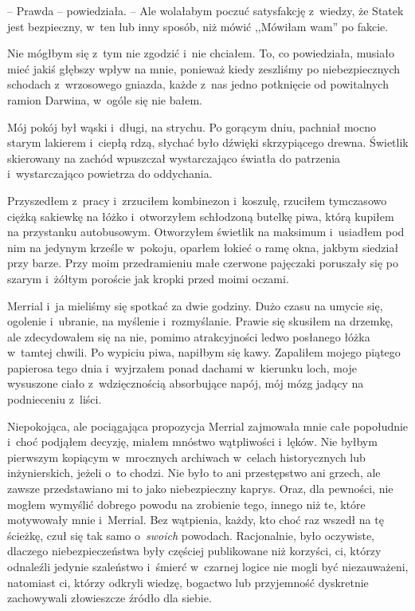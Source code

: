 \documentclass[oneside,polish,11pt,sfheadings]{mwbk}
\begin{document}
-- Prawda -- powiedziała. -- Ale wolałabym poczuć satysfakcję z~wiedzy, że
Statek jest bezpieczny, w~ten lub inny sposób, niż mówić ,,Mówiłam wam''
po fakcie.

Nie mógłbym się z~tym nie zgodzić i~nie chciałem. To, co powiedziała,
musiało mieć jakiś głębszy wpływ na mnie, ponieważ kiedy zeszliśmy po
niebezpiecznych schodach z~wrzosowego gniazda, każde z~nas jedno
potknięcie od powitalnych ramion Darwina, w~ogóle się nie bałem.

Mój pokój był wąski i~długi, na strychu. Po gorącym dniu, pachniał mocno
starym lakierem i~ciepłą rdzą, słychać było dźwięki skrzypiącego drewna.
Świetlik skierowany na zachód wpuszczał wystarczająco światła do
patrzenia i~wystarczająco powietrza do oddychania.

Przyszedłem z~pracy i~zrzuciłem kombinezon i~koszulę, rzuciłem
tymczasowo ciężką sakiewkę na łóżko i~otworzyłem schłodzoną butelkę
piwa, którą kupiłem na przystanku autobusowym. Otworzyłem świetlik na
maksimum i~usiadłem pod nim na jedynym krześle w~pokoju, oparłem łokieć
o ramę okna, jakbym siedział przy barze. Przy moim przedramieniu małe
czerwone pajęczaki poruszały się po szarym i~żółtym poroście jak kropki
przed moimi oczami.

Merrial i~ja mieliśmy się spotkać za dwie godziny. Dużo czasu na umycie
się, ogolenie i~ubranie, na myślenie i~rozmyślanie. Prawie się skusiłem
na drzemkę, ale zdecydowałem się na nie, pomimo atrakcyjności ledwo
posłanego łóżka w~tamtej chwili. Po wypiciu piwa, napiłbym się kawy.
Zapaliłem mojego piątego papierosa tego dnia i~wyjrzałem ponad dachami w~kierunku loch, moje wysuszone ciało z~wdzięcznością absorbujące napój,
mój mózg jadący na podnieceniu z~liści.

Niepokojąca, ale pociągająca propozycja Merrial zajmowała mnie całe
popołudnie i~choć podjąłem decyzję, miałem mnóstwo wątpliwości i~lęków.
Nie byłbym pierwszym kopiącym w~mrocznych archiwach w~celach
historycznych lub inżynierskich, jeżeli o~to chodzi. Nie było to ani
przestępstwo ani grzech, ale zawsze przedstawiano mi to jako
niebezpieczny kaprys. Oraz, dla pewności, nie mogłem wymyślić dobrego
powodu na zrobienie tego, innego niż te, które motywowały mnie i~Merrial. Bez wątpienia, każdy, kto choć raz wszedł na tę ścieżkę, czuł
się tak samo o~\textit{swoich} powodach. Racjonalnie, było oczywiste,
dlaczego niebezpieczeństwa były częściej publikowane niż korzyści, ci,
którzy odnaleźli jedynie szaleństwo i~śmierć w~czarnej logice nie mogli
być niezauważeni, natomiast ci, którzy odkryli wiedzę, bogactwo lub
przyjemność dyskretnie zachowywali złowieszcze źródło dla siebie.
\end{document}
